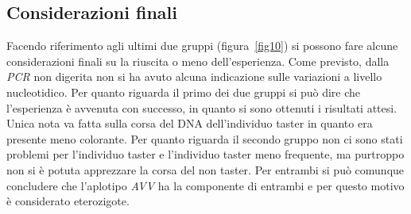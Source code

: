 	\subsection*{Considerazioni finali}
	Facendo riferimento agli ultimi due gruppi (figura~\ref{fig10}) si possono fare alcune considerazioni finali su la riuscita o meno dell'esperienza. 
	Come previsto, dalla \emph{PCR} non digerita non si ha avuto alcuna indicazione sulle variazioni a livello nucleotidico.
	Per quanto riguarda il primo dei due gruppi si può dire che l'esperienza è avvenuta con successo, in quanto si sono ottenuti i risultati attesi. 
	Unica nota va fatta sulla corsa del DNA dell'individuo taster in quanto era presente meno colorante. 
	Per quanto riguarda il secondo gruppo non ci sono stati problemi per l'individuo taster e l'individuo taster meno frequente, ma purtroppo non si è potuta apprezzare la corsa del non taster. 
	Per entrambi si può comunque concludere che l'aplotipo \emph{AVV} ha la componente di entrambi e per questo motivo è considerato eterozigote.
